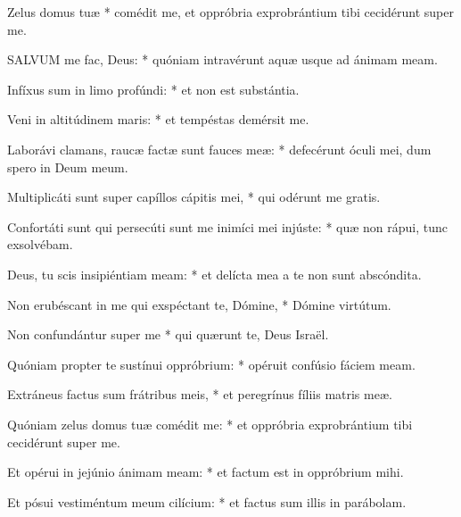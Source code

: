 





 Zelus domus tuæ * comédit me, et oppróbria exprobrántium tibi cecidérunt super me.


\lettrine[lines=2]{S}{ALVUM} me fac, Deus: * quóniam intravérunt aquæ usque ad ánimam meam.

Infíxus sum in limo profúndi: * et non est substántia.

Veni in altitúdinem maris: * et tempéstas demérsit me.

Laborávi clamans, raucæ factæ sunt fauces meæ: * defecérunt óculi mei, dum spero in Deum meum.

Multiplicáti sunt super capíllos cápitis mei, * qui odérunt me gratis.

Confortáti sunt qui persecúti sunt me inimíci mei injúste: * quæ non rápui, tunc exsolvébam.

Deus, tu scis insipiéntiam meam: * et delícta mea a te non sunt abscóndita.

Non erubéscant in me qui exspéctant te, Dómine, * Dómine virtútum.

Non confundántur super me * qui quærunt te, Deus Israël.

Quóniam propter te sustínui oppróbrium: * opéruit confúsio fáciem meam.

Extráneus factus sum frátribus meis, * et peregrínus fíliis matris meæ.

Quóniam zelus domus tuæ comédit me: * et oppróbria exprobrántium tibi cecidérunt super me.

Et opérui in jejúnio ánimam meam: * et factum est in oppróbrium mihi.

Et pósui vestiméntum meum cilícium: * et factus sum illis in parábolam.

